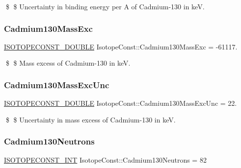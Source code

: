 \$ \$ Uncertainty in binding energy per A of Cadmium-\/130 in keV. \mbox{\label{group___isotope_const-_cadmium-_cd130_ga9df458bf60ba75393d56ed997371ef48}} 
\subsubsection{\texorpdfstring{Cadmium130\+Mass\+Exc}{Cadmium130MassExc}}
{\footnotesize\ttfamily \mbox{\hyperlink{group___isotope_const-_macros_ga8f45a7272ce02c0b4c65c44636ed719a}{I\+S\+O\+T\+O\+P\+E\+C\+O\+N\+S\+T\+\_\+\+D\+O\+U\+B\+LE}} Isotope\+Const\+::\+Cadmium130\+Mass\+Exc = -\/61117.}

\$ \$ Mass excess of Cadmium-\/130 in keV. \mbox{\label{group___isotope_const-_cadmium-_cd130_gacb2c237768c0529cfb0e26281875f373}} 
\subsubsection{\texorpdfstring{Cadmium130\+Mass\+Exc\+Unc}{Cadmium130MassExcUnc}}
{\footnotesize\ttfamily \mbox{\hyperlink{group___isotope_const-_macros_ga8f45a7272ce02c0b4c65c44636ed719a}{I\+S\+O\+T\+O\+P\+E\+C\+O\+N\+S\+T\+\_\+\+D\+O\+U\+B\+LE}} Isotope\+Const\+::\+Cadmium130\+Mass\+Exc\+Unc = 22.}

\$ \$ Uncertainty in mass excess of Cadmium-\/130 in keV. \mbox{\label{group___isotope_const-_cadmium-_cd130_gaacc3bf0a1a699ef1e801e687e548a5df}} 
\subsubsection{\texorpdfstring{Cadmium130\+Neutrons}{Cadmium130Neutrons}}
{\footnotesize\ttfamily \mbox{\hyperlink{group___isotope_const-_macros_ga5f18360b3e99483a35c32d789e62621c}{I\+S\+O\+T\+O\+P\+E\+C\+O\+N\+S\+T\+\_\+\+I\+NT}} Isotope\+Const\+::\+Cadmium130\+Neutrons = 82}


